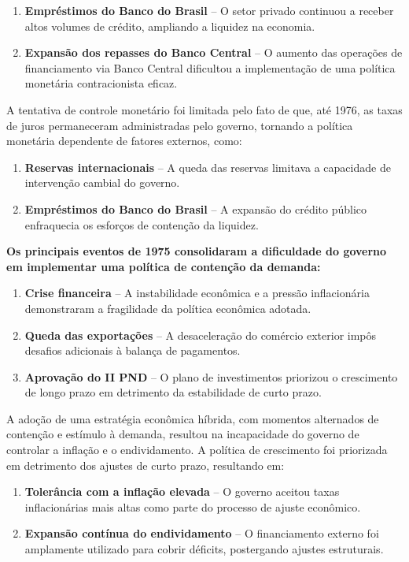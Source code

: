\documentclass[a4paper,12pt]{article}[abntex2]
\begin{document}
\begin{enumerate}
    \item \textbf{Empréstimos do Banco do Brasil} – O setor privado continuou a receber altos volumes de crédito, ampliando a liquidez na economia.
    \item \textbf{Expansão dos repasses do Banco Central} – O aumento das operações de financiamento via Banco Central dificultou a implementação de uma política monetária contracionista eficaz.
\end{enumerate}

A tentativa de controle monetário foi limitada pelo fato de que, até 1976, as taxas de juros permaneceram administradas pelo governo, tornando a política monetária dependente de fatores externos, como:

\begin{enumerate}
    \item \textbf{Reservas internacionais} – A queda das reservas limitava a capacidade de intervenção cambial do governo.
    \item \textbf{Empréstimos do Banco do Brasil} – A expansão do crédito público enfraquecia os esforços de contenção da liquidez.
\end{enumerate}

\textbf{Os principais eventos de 1975 consolidaram a dificuldade do governo em implementar uma política de contenção da demanda:}

\begin{enumerate}
    \item \textbf{Crise financeira} – A instabilidade econômica e a pressão inflacionária demonstraram a fragilidade da política econômica adotada.
    \item \textbf{Queda das exportações} – A desaceleração do comércio exterior impôs desafios adicionais à balança de pagamentos.
    \item \textbf{Aprovação do II PND} – O plano de investimentos priorizou o crescimento de longo prazo em detrimento da estabilidade de curto prazo.
\end{enumerate}

A adoção de uma estratégia econômica híbrida, com momentos alternados de contenção e estímulo à demanda, resultou na incapacidade do governo de controlar a inflação e o endividamento. A política de crescimento foi priorizada em detrimento dos ajustes de curto prazo, resultando em:

\begin{enumerate}
    \item \textbf{Tolerância com a inflação elevada} – O governo aceitou taxas inflacionárias mais altas como parte do processo de ajuste econômico.
    \item \textbf{Expansão contínua do endividamento} – O financiamento externo foi amplamente utilizado para cobrir déficits, postergando ajustes estruturais.
\end{enumerate}
\end{document}
